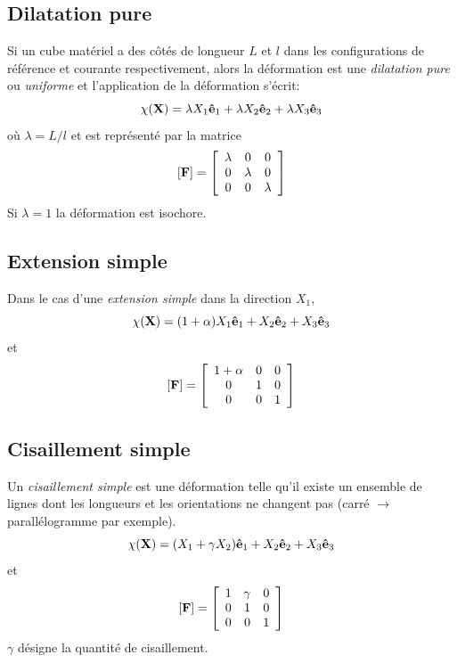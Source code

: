 \subsection{Dilatation pure}
Si un cube matériel a des côtés de longueur $L$ et $l$ dans les configurations de référence et courante respectivement, alors la déformation est une \emph{dilatation pure} ou \emph{uniforme} et l'application de la déformation s'écrit:
$$\chi(\textbf{X})=\lambda X_1\textbf{ê}_1+\lambda X_2\textbf{ê}_2+\lambda X_3\textbf{ê}_3$$ où $\lambda=L/l$ et  est représenté par la matrice
$$[\textbf{F}]=\left[\begin{array}{ccc}
\lambda&0&0\\
0&\lambda&0\\
0&0&\lambda
\end{array}\right]$$ Si $\lambda=1$ la déformation est isochore.
\subsection{Extension simple}
Dans le cas d'une \emph{extension simple} dans la direction $X_1$, $$\chi(\textbf{X})=(1+\alpha)X_1\textbf{ê}_1+X_2\textbf{ê}_2+X_3\textbf{ê}_3$$ et $$[\textbf{F}]=\left[\begin{array}{ccc}
1+\alpha&0&0\\
0&1&0\\
0&0&1
\end{array}\right]$$
\subsection{Cisaillement simple}
\label{cisaillement}
Un \emph{cisaillement simple} est une déformation telle qu'il existe un ensemble de lignes dont les longueurs et les orientations ne changent pas (carré $\longrightarrow$ parallélogramme par exemple).
$$\chi(\textbf{X})=(X_1+\gamma X_2)\textbf{ê}_1+X_2\textbf{ê}_2+X_3\textbf{ê}_3$$
et
$$[\textbf{F}]=\left[\begin{array}{ccc}
1&\gamma&0\\
0&1&0\\
0&0&1
\end{array}\right]$$ $\gamma$ désigne la quantité de cisaillement.

